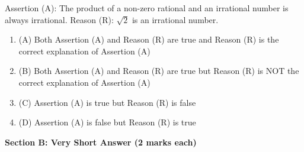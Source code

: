\documentclass[12pt,a4paper]{exam}
\begin{document}
\begin{questions}
\question[1] Assertion (A): The product of a non-zero rational and an irrational number is always irrational. Reason (R): $\sqrt{2}$ is an irrational number.
\begin{enumerate}[label=(\Alph*)]
  \item (A) Both Assertion (A) and Reason (R) are true and Reason (R) is the correct explanation of Assertion (A)
  \item (B) Both Assertion (A) and Reason (R) are true but Reason (R) is NOT the correct explanation of Assertion (A)
  \item (C) Assertion (A) is true but Reason (R) is false
  \item (D) Assertion (A) is false but Reason (R) is true
\end{enumerate}
\vspace{0.15cm}

\end{questions}
\bigskip
\noindent\textbf{\large Section B: Very Short Answer (2 marks each)}
\end{document}
